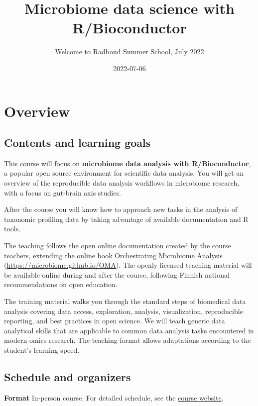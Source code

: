 \documentclass[
  oneside]{book}
\title{Microbiome data science with R/Bioconductor}
\subtitle{Welcome to Radboud Summer School, July 2022}
\author{}
\date{\vspace{-2.5em}2022-07-06}
\begin{document}
\maketitle

{
\setcounter{tocdepth}{1}
\tableofcontents
}
\hypertarget{overview}{%
\chapter{Overview}\label{overview}}

\hypertarget{contents-and-learning-goals}{%
\section{Contents and learning goals}\label{contents-and-learning-goals}}

This course will focus on \textbf{microbiome data analysis
with R/Bioconductor}, a popular open source environment for
scientific data analysis. You will get an overview of the
reproducible data analysis workflows in microbiome research, with a
focus on gut-brain axis studies.

After the course you will know how to approach new tasks in the
analysis of taxonomic profiling data by taking advantage of available
documentation and R tools.

The teaching follows the open online documentation created by the
course teachers, extending the online book Orchestrating Microbiome
Analysis (\url{https://microbiome.github.io/OMA}). The openly licensed
teaching material will be available online during and after the
course, following Finnish national recommendations on open education.

The training material walks you through the standard steps of
biomedical data analysis covering data access, exploration, analysis,
visualization, reproducible reporting, and best practices in open
science. We will teach generic data analytical skills that are
applicable to common data analysis tasks encountered in modern omics
research. The teaching format allows adaptations according to the
student's learning speed.

\hypertarget{schedule-and-organizers}{%
\section{Schedule and organizers}\label{schedule-and-organizers}}

\textbf{Format} In-person course. For detailed schedule, see the
\href{https://www.ru.nl/radboudsummerschool/courses/2022/registration-longer-possible-brain-bacteria}{course
website}.
\end{document}
